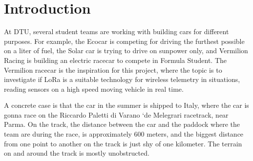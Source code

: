 \section{Introduction}
At DTU, several student teams are working with building cars for different purposes. For example, the Ecocar is competing for driving the furthest possible on a liter of fuel, the Solar car is trying to drive on sunpower only, and Vermilion Racing is building an electric racecar to compete in Formula Student. The Vermilion racecar is the inspiration for this project, where the topic is to investigate if LoRa is a suitable technology for wireless telemetry in situations, reading sensors on a high speed moving vehicle in real time.

A concrete case is that the car in the summer is shipped to Italy, where the car is gonna race on the Riccardo Paletti di Varano `de Melegrari racetrack, near Parma. On the track, the distance between the car and the paddock where the team are during the race, is approximately 600 meters, and the biggest distance from one point to another on the track is just shy of one kilometer. The terrain on and around the track is mostly unobstructed.
